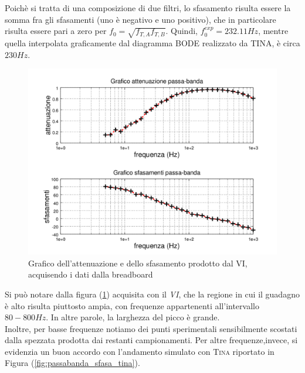 \documentclass[journal, a4paper]{IEEEtran}
\begin{document}
Poichè si tratta di una composizione di due filtri, lo sfasamento risulta essere la somma fra gli sfasamenti (uno è negativo e uno positivo), che in particolare risulta essere pari a zero per $f_0 = \sqrt{f_{T,A}f_{T,B}} $. Quindi, $f_0^{exp} = 232.11 \si{Hz}$, mentre quella interpolata graficamente dal diagramma \textsc{BODE} realizzato da \textsc{TINA}, è circa $230 \si{Hz}$. 

\begin{figure}
\centering
\includegraphics[width=1.1\linewidth]{./passabanda_sfasa_octave}
\caption{Grafico dell'attenuazione e dello sfasamento prodotto dal VI, acquisendo i dati dalla breadboard}
\label{fig:passabanda_sfasa_octave}
\end{figure}


Si può notare dalla figura (\ref{fig:passabanda_sfasa_octave}) acquisita con il \textit{VI}, che la regione in cui il guadagno è alto risulta piuttosto ampia, con frequenze appartenenti all'intervallo $80-800 \si{Hz}$. In altre parole, la larghezza del picco è grande. \\
Inoltre, per basse frequenze notiamo dei punti sperimentali sensibilmente scostati dalla spezzata prodotta dai restanti campionamenti. Per altre frequenze,invece, si evidenzia un buon accordo con l'andamento simulato con \textsc{Tina} riportato in Figura (\ref{fig:passabanda_sfasa_tina}). 
\end{document}
